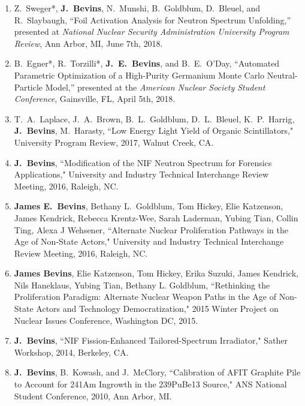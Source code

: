 \begin{enumerate}

  \item Z.\ Sweger*, \textbf{J.\ Bevins}, N.\ Munshi, B.\ Goldblum, D.\ Bleuel, and R.\ Slaybaugh, ``Foil Activation Analysis for Neutron Spectrum Unfolding,” presented at \textit{National Nuclear Security Administration University Program Review}, Ann Arbor, MI, June 7th, 2018.

  \item B.\ Egner*, R.\ Torzilli*, \textbf{J.\ E.\ Bevins}, and B.\ E.\ O’Day, ``Automated Parametric Optimization of a High-Purity Germanium Monte Carlo Neutral-Particle Model,” presented at the \textit{American Nuclear Society Student Conference}, Gainsville, FL, April 5th, 2018.

  \item T.\ A.\ Laplace, J.\ A.\ Brown, B.\ L.\ Goldblum, D.\ L.\ Bleuel, K.\ P.\ Harrig, \textbf{J.\ Bevins}, M.\ Harasty, ``Low Energy Light Yield of Organic Scintillators," University Program Review, 2017, Walnut Creek, CA.
  
  \item \textbf{J.\ Bevins}, ``Modification of the NIF Neutron Spectrum for Forensics Applications," University and Industry Technical Interchange Review Meeting, 2016, Raleigh, NC.
  
  \item \textbf{James E.\ Bevins}, Bethany L.\ Goldblum, Tom Hickey, Elie Katzenson, James Kendrick, Rebecca Krentz-Wee, Sarah Laderman, Yubing Tian, Collin Ting, Alexa J Wehsener, ``Alternate Nuclear Proliferation Pathways in the Age of Non-State Actors," University and Industry Technical Interchange Review Meeting, 2016, Raleigh, NC.

  \item \textbf{James Bevins}, Elie Katzenson, Tom Hickey, Erika Suzuki, James Kendrick, Nils Haneklaus, Yubing Tian, Bethany L. Goldblum, ``Rethinking the Proliferation Paradigm: Alternate Nuclear Weapon Paths in the Age of Non-State Actors and Technology Democratization," 2015 Winter Project on Nuclear Issues Conference, Washington DC, 2015.
  
  \item \textbf{J.\ Bevins}, ``NIF Fission-Enhanced Tailored-Spectrum Irradiator," Sather Workshop, 2014, Berkeley, CA.
  
  \item \textbf{J.\ Bevins}, B.\ Kowash, and J.\ McClory, ``Calibration of AFIT Graphite Pile to Account for 241Am Ingrowth in the 239PuBe13 Source," ANS National Student Conference, 2010, Ann Arbor, MI.
\end{enumerate}

